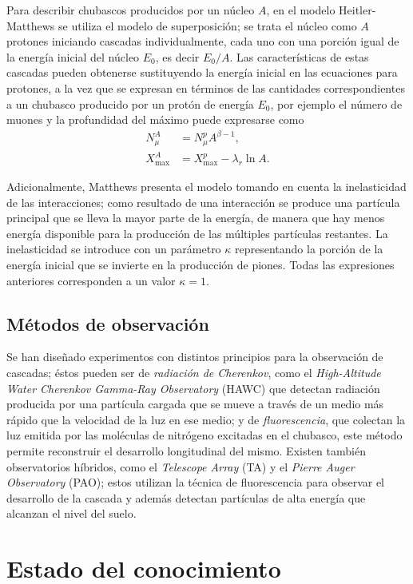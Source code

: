 	Para describir chubascos producidos por un núcleo $A$, en el modelo Heitler-Matthews se utiliza el modelo de superposición; se trata el núcleo como $A$ protones iniciando cascadas individualmente, cada uno con una porción igual de la energía inicial del núcleo $E_0$, es decir $E_0/A$. Las características de estas cascadas pueden obtenerse sustituyendo la energía inicial en las ecuaciones para protones, a la vez que se expresan en términos de las cantidades correspondientes a un chubasco producido por un protón de energía $E_0$, por ejemplo el número de muones y la profundidad del máximo puede expresarse como
	\begin{align}
	N_{\mu}^{A}		  	&= N_{\mu}^{p} A^{\beta -1}, \\ 
	X_{\text{max}}^{A} 	&= X_{\text{max}}^{p} - \lambda_r \ln A.
	\end{align}

	Adicionalmente, Matthews presenta el modelo tomando en cuenta la inelasticidad de las interacciones; como resultado de una interacción se produce una partícula principal que se lleva la mayor parte de la energía, de manera que hay menos energía disponible para la producción de las múltiples partículas restantes. La inelasticidad se introduce con un parámetro $\kappa$ representando la porción de la energía inicial que se invierte en la producción de piones. Todas las expresiones anteriores corresponden a un valor $\kappa = 1$.

	
	\subsection{Métodos de observación}
	Se han diseñado experimentos con distintos principios para la observaci\'on de cascadas; \'estos pueden ser de \textit{radiación de Cherenkov}, como el \textit{High-Altitude Water Cherenkov Gamma-Ray Observatory} (HAWC) que detectan radiación producida por una partícula cargada que se mueve a través de un medio más rápido que la velocidad de la luz en ese medio; y de \textit{fluorescencia}, que colectan la luz emitida por las moléculas de nitrógeno excitadas en el chubasco, este método permite reconstruir el desarrollo longitudinal del mismo. Existen también observatorios híbridos, como el \textit{Telescope Array} (TA) y el \textit{Pierre Auger Observatory} (PAO); estos utilizan la técnica de fluorescencia para observar el desarrollo de la cascada y además detectan partículas de alta energía que alcanzan el nivel del suelo.
	
\section{Estado del conocimiento}

